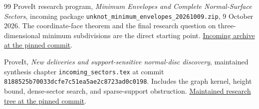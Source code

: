 \documentclass[11pt,letterpaper]{article}
\theoremstyle{definition}
\theoremstyle{remark}\newtheorem{remark}[theorem]{Remark}
\newcommand{\code}[1]{\nolinkurl{#1}}
\newcommand{\basecommit}{\nolinkurl{8188525b70033dcfe7c51ea5ae2c8723ad0c0198}}
\begin{document}
\begin{thebibliography}{99}
ProveIt research program, \emph{Minimum Envelopes and Complete Normal-Surface
Sectors}, incoming package \code{unknot_minimum_envelopes_20261009.zip},
9 October 2026. The coordinate-face theorem and the final research question
on three-dimensional minimum subdivisions are the direct starting point.
\href{https://github.com/VladimirReshetnikov/ProveIt/blob/8188525b70033dcfe7c51ea5ae2c8723ad0c0198/docs/incoming/unknot_minimum_envelopes_20261009.zip}{Incoming archive at the pinned commit}.

ProveIt, \emph{New deliveries and support-sensitive normal-disc discovery},
maintained synthesis chapter \code{incoming_sectors.tex} at commit
\basecommit. Includes the graph kernel, height bound, dense-sector search,
and sparse-support obstruction.
\href{https://github.com/VladimirReshetnikov/ProveIt/tree/8188525b70033dcfe7c51ea5ae2c8723ad0c0198/Topology/UnknotRecognition}{Maintained research tree at the pinned commit}.

\end{thebibliography}
\end{document}
